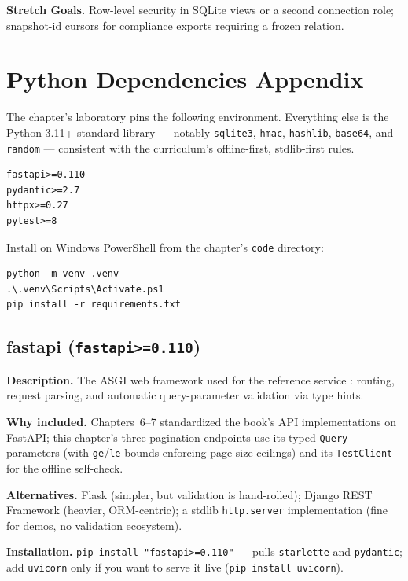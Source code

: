 \textbf{Stretch Goals.} Row-level security in SQLite views or a second
connection role; snapshot-id cursors for compliance exports requiring a
frozen relation.

\section{Python Dependencies Appendix}
\label{sec:ch8-dependencies}

The chapter's laboratory pins the following environment. Everything else is
the Python 3.11+ standard library --- notably \texttt{sqlite3},
\texttt{hmac}, \texttt{hashlib}, \texttt{base64}, and \texttt{random} ---
consistent with the curriculum's offline-first, stdlib-first rules.

\begin{verbatim}
fastapi>=0.110
pydantic>=2.7
httpx>=0.27
pytest>=8
\end{verbatim}

Install on Windows PowerShell from the chapter's \texttt{code} directory:

\begin{verbatim}
python -m venv .venv
.\.venv\Scripts\Activate.ps1
pip install -r requirements.txt
\end{verbatim}

\subsection{fastapi (\texttt{fastapi>=0.110})}

\textbf{Description.} The ASGI web framework used for the reference service
\cite{fastapidocs}: routing, request parsing, and automatic
query-parameter validation via type hints.

\textbf{Why included.} Chapters~6--7 standardized the book's API
implementations on FastAPI; this chapter's three pagination endpoints use
its typed \texttt{Query} parameters (with \texttt{ge}/\texttt{le} bounds
enforcing page-size ceilings) and its \texttt{TestClient} for the offline
self-check.

\textbf{Alternatives.} Flask (simpler, but validation is hand-rolled);
Django REST Framework (heavier, ORM-centric); a stdlib
\texttt{http.server} implementation (fine for demos, no validation
ecosystem).

\textbf{Installation.} \texttt{pip install "fastapi>=0.110"} --- pulls
\texttt{starlette} and \texttt{pydantic}; add \texttt{uvicorn} only if you
want to serve it live (\texttt{pip install uvicorn}).

